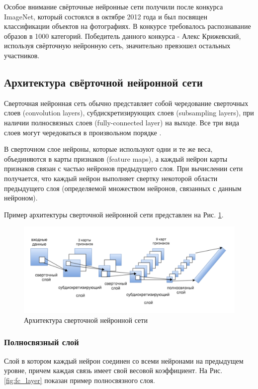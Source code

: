 Особое внимание свёрточные нейронные сети получили после конкурса ImageNet\cite{imagenet}, который состоялся в октябре 2012 года и был посвящен классификации объектов на фотографиях. В конкурсе требовалось распознавание образов в 1000 категорий. Победитель данного конкурса - Алекс Крижевский, используя свёрточную нейронную сеть, значительно превзошел остальных участников\cite{alexnet}.

\subsection{Архитектура свёрточной нейронной сети} \label{cnnarch}
Сверточная нейронная сеть обычно представляет собой чередование сверточных слоев (convolution layers), субдискретизирующих слоев (subsampling layers), при наличии полносвязных слоев (fully-connected layer) на выходе. Все три вида слоев могут чередоваться в произвольном порядке \cite{LeCun1998GradientbasedLA}.

В сверточном слое нейроны, которые используют одни и те же веса, объединяются в карты признаков (feature maps), а каждый нейрон карты признаков связан с частью нейронов предыдущего слоя. При вычислении сети получается, что каждый нейрон выполняет свертку некоторой области предыдущего слоя (определяемой множеством нейронов, связанных с данным нейроном).

Пример архитектуры сверточной нейронной сети представлен на Рис. \ref{fig:convnet}.
\begin{figure}[ht]
    \centering
    \includegraphics [width=\textwidth*2/3] {images/convnet.png}
    \caption{ Архитектура сверточной нейронной сети}
    \label{fig:convnet}
\end{figure}

\subsubsection{Полносвязный слой} \label{fc_layers}
Слой в котором каждый нейрон соединен со всеми нейронами на предыдущем уровне, причем каждая связь имеет свой весовой коэффициент. На Рис.\ref{fig:fc_layer} показан пример полносвязного слоя.

